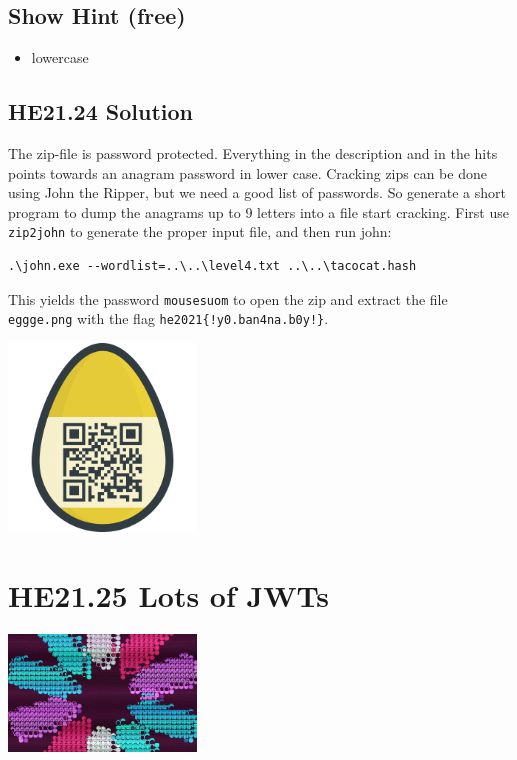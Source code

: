 \documentclass[english,a4paper,nols,noindent]{tufte-handout}
\begin{document}
\subsection{Show Hint (free)}
\begin{itemize}
\item lowercase
\end{itemize}

\hypertarget{he21.24-solution}{%
\subsection{HE21.24 Solution}\label{he21.24-solution}}

\noindent The zip-file is password protected.  Everything in the description
and in the hits points towards an anagram password in lower case.  Cracking
zips can be done using John the Ripper, but we need a good list of passwords.
So generate a short program to dump the anagrams up to 9 letters into a file
start cracking.  First use \verb+zip2john+ to generate the proper input file,
and then run john:

\begin{verbatim} 
.\john.exe --wordlist=..\..\level4.txt ..\..\tacocat.hash
\end{verbatim}

\noindent This yields the password \verb+mousesuom+ to open the zip and extract the file
\verb+eggge.png+ with the flag \verb+he2021{!y0.ban4na.b0y!}+.

\begin{marginfigure}
    \includegraphics[width=50mm]{ch24/eggge.png}
\end{marginfigure}

\hypertarget{he21.25}{%
  \section{HE21.25 Lots of JWTs}
  \label{he21.25}}
\begin{marginfigure}
    \includegraphics[width=50mm]{images/challenge25.jpg}
\end{marginfigure}
\end{document}
